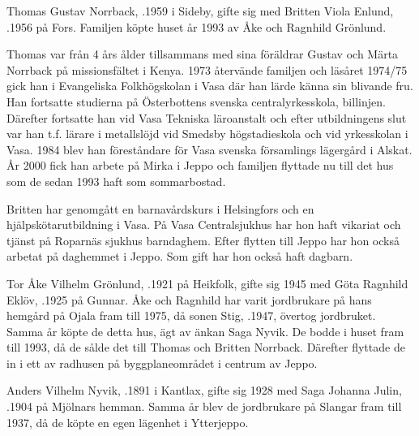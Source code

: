 


Thomas Gustav Norrback, .1959 i Sideby, gifte sig med Britten Viola Enlund, .1956 på Fors. Familjen köpte huset år 1993  av Åke och Ragnhild Grönlund.

Thomas var från 4 års ålder tillsammans med sina föräldrar Gustav och Märta Norrback på missionsfältet i Kenya. 1973 återvände familjen och läsåret 1974/75 gick han i Evangeliska Folkhögskolan i Vasa där han lärde känna sin blivande fru. Han fortsatte studierna på Österbottens svenska centralyrkesskola, billinjen. Därefter fortsatte han vid Vasa Tekniska läroanstalt och efter utbildningens slut var han t.f. lärare i metallslöjd vid Smedsby högstadieskola och vid yrkesskolan i Vasa. 1984 blev han föreståndare för Vasa svenska församlings lägergård i Alskat. År 2000 fick han arbete på Mirka i Jeppo och familjen flyttade nu till det hus som de sedan 1993 haft som sommarbostad.

Britten har genomgått en barnavårdskurs i Helsingfors och en hjälpskötarutbildning i Vasa. På Vasa Centralsjukhus har hon haft vikariat och tjänst på Roparnäs sjukhus barndaghem. Efter flytten till Jeppo har hon också  arbetat på daghemmet i Jeppo. Som gift har hon också haft dagbarn.
\begin{jhchildren}
  \item {}
  \item {}
  \item {}
\end{jhchildren}


Tor Åke Vilhelm Grönlund, .1921 på Heikfolk, gifte sig 1945 med Göta Ragnhild Eklöv, .1925 på Gunnar. Åke och Ragnhild har varit jordbrukare på hans hemgård på Ojala fram till 1975, då sonen Stig, .1947, övertog jordbruket. Samma år köpte de detta hus, ägt av änkan Saga Nyvik. De bodde i huset fram till 1993, då de sålde det till Thomas och Britten Norrback. Därefter flyttade de in i ett av radhusen på byggplaneområdet i centrum av Jeppo.


Anders Vilhelm Nyvik, .1891 i Kantlax, gifte sig 1928 med Saga Johanna Julin, .1904 på Mjölnars hemman. Samma år blev de jordbrukare på Slangar fram till 1937, då de köpte en egen lägenhet i Ytterjeppo.


